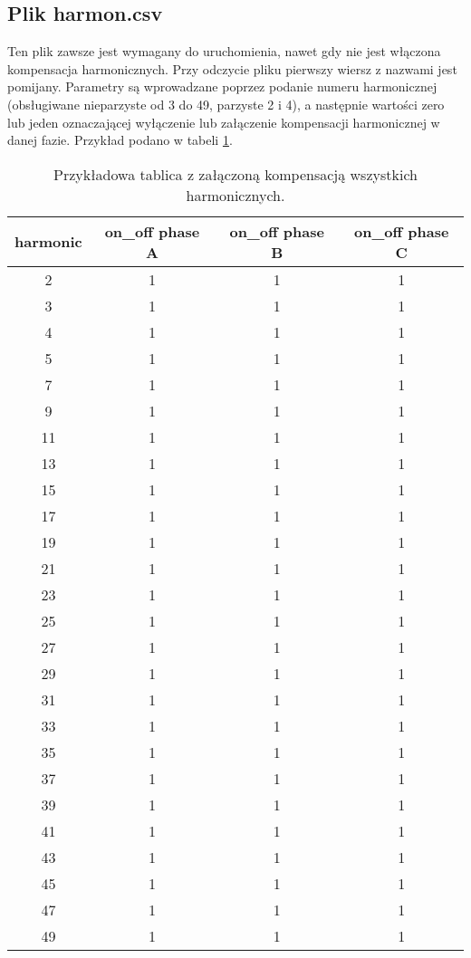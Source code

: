 \documentclass[12pt,a4paper]{article}
\begin{document}
\subsection{Plik harmon.csv}
Ten plik zawsze jest wymagany do uruchomienia, nawet gdy nie jest włączona kompensacja harmonicznych. Przy odczycie pliku pierwszy wiersz z nazwami jest pomijany. Parametry są wprowadzane poprzez podanie numeru harmonicznej (obsługiwane nieparzyste od 3 do 49, parzyste 2 i 4), a następnie wartości zero lub jeden oznaczającej wyłączenie lub załączenie kompensacji harmonicznej w danej fazie. Przykład podano w tabeli \ref{tab:harmon}.
\begin{table}[]
	\centering
	\begin{tabular}{|c|c|c|c|}
		\hline
		harmonic & on\_off phase A & on\_off phase B & on\_off phase C \\ \hline
		2 & 1 & 1 & 1 \\ \hline
		3 & 1 & 1 & 1 \\ \hline
		4 & 1 & 1 & 1 \\ \hline
		5 & 1 & 1 & 1 \\ \hline
		7 & 1 & 1 & 1 \\ \hline
		9 & 1 & 1 & 1 \\ \hline
		11 & 1 & 1 & 1 \\ \hline
		13 & 1 & 1 & 1 \\ \hline
		15 & 1 & 1 & 1 \\ \hline
		17 & 1 & 1 & 1 \\ \hline
		19 & 1 & 1 & 1 \\ \hline
		21 & 1 & 1 & 1 \\ \hline
		23 & 1 & 1 & 1 \\ \hline
		25 & 1 & 1 & 1 \\ \hline
		27 & 1 & 1 & 1 \\ \hline
		29 & 1 & 1 & 1 \\ \hline
		31 & 1 & 1 & 1 \\ \hline
		33 & 1 & 1 & 1 \\ \hline
		35 & 1 & 1 & 1 \\ \hline
		37 & 1 & 1 & 1 \\ \hline
		39 & 1 & 1 & 1 \\ \hline
		41 & 1 & 1 & 1 \\ \hline
		43 & 1 & 1 & 1 \\ \hline
		45 & 1 & 1 & 1 \\ \hline
		47 & 1 & 1 & 1 \\ \hline
		49 & 1 & 1 & 1 \\ \hline
	\end{tabular}
\caption{\label{tab:harmon}Przykładowa tablica z załączoną kompensacją wszystkich harmonicznych.}
\end{table}
\end{document}
